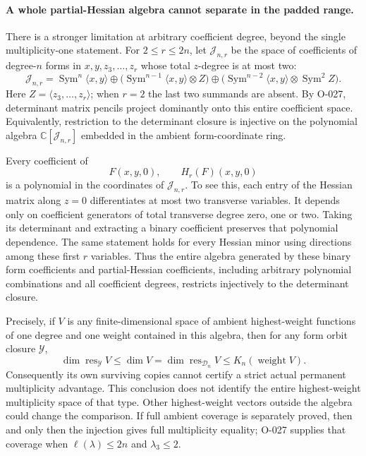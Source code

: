 \paragraph{A whole partial-Hessian algebra cannot separate in the padded range.}
There is a stronger limitation at arbitrary coefficient
degree, beyond the single multiplicity-one statement.
For \(2\leq r\leq2n\), let \(\mathcal J_{n,r}\) be the
space of coefficients of degree-\(n\) forms in
\(x,y,z_3,\ldots,z_r\) whose total \(z\)-degree is at
most two:
\[
 \mathcal J_{n,r}=
 \operatorname{Sym}^n\langle x,y\rangle
 \oplus
 \bigl(\operatorname{Sym}^{n-1}\langle x,y\rangle\otimes Z\bigr)
 \oplus
 \bigl(\operatorname{Sym}^{n-2}\langle x,y\rangle
                                    \otimes\operatorname{Sym}^2Z\bigr).
                                                               \tag{A-035.9}
\]
Here \(Z=\langle z_3,\ldots,z_r\rangle\); when \(r=2\)
the last two summands are absent.
By O-027, determinant matrix pencils project dominantly
onto this entire coefficient space. Equivalently,
restriction to the determinant closure is injective on
the polynomial algebra \(\mathbb C[\mathcal J_{n,r}]\)
embedded in the ambient form-coordinate ring.

Every coefficient of
\[
                 F(x,y,0),\qquad H_r(F)(x,y,0)
 \]
is a polynomial in the coordinates of
\(\mathcal J_{n,r}\). To see this, each entry of
the Hessian matrix along \(z=0\) differentiates at
most two transverse variables. It depends only on
coefficient generators of total transverse degree
zero, one or two. Taking its determinant and
extracting a binary coefficient preserves that
polynomial dependence.
The same statement holds for every Hessian minor
using directions among these first \(r\) variables.
Thus the entire algebra generated by these binary
form coefficients and partial-Hessian coefficients,
including arbitrary polynomial combinations and
all coefficient degrees, restricts injectively to
the determinant closure.

Precisely, if \(V\) is any finite-dimensional space
of ambient highest-weight functions of one degree
and one weight contained in this algebra, then
for any form orbit closure \(\mathcal Y\),
\[
 \dim\operatorname{res}_{\mathcal Y}V
          \leq\dim V
          =\dim\operatorname{res}_{\mathcal D_n}V
          \leq K_n(\operatorname{weight}V).
                                                               \tag{A-035.10}
\]
Consequently its own surviving copies cannot certify
a strict actual permanent multiplicity advantage.
This conclusion does not identify the entire
highest-weight multiplicity space of that type.
Other highest-weight vectors outside the algebra
could change the comparison. If full ambient
coverage is separately proved, then and only then
the injection gives full multiplicity equality;
O-027 supplies that coverage when
\(\ell(\lambda)\leq2n\) and \(\lambda_3\leq2\).

